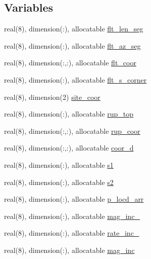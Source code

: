 \subsection*{Variables}
\begin{DoxyCompactItemize}
\item 
real(8), dimension(\+:), allocatable \hyperlink{namespaceflt__module_aca5726712ea516198b181e7cb2f58a79}{flt\+\_\+len\+\_\+seg}
\item 
real(8), dimension(\+:), allocatable \hyperlink{namespaceflt__module_afe7ee1528f7162ad84a3517be2962885}{flt\+\_\+az\+\_\+seg}
\item 
real(8), dimension(\+:,\+:), allocatable \hyperlink{namespaceflt__module_a5f040c388185e1ef250084d5c59d41e9}{flt\+\_\+coor}
\item 
real(8), dimension(\+:), allocatable \hyperlink{namespaceflt__module_ade0f97d7261ffc38567aa16de68c1583}{flt\+\_\+s\+\_\+corner}
\item 
real(8), dimension(2) \hyperlink{namespaceflt__module_a2aeddbabcca2c320d94712a5ef502b79}{site\+\_\+coor}
\item 
real(8), dimension(\+:), allocatable \hyperlink{namespaceflt__module_ab5c2fb389cfd0080d938d50ef55e28ef}{rup\+\_\+top}
\item 
real(8), dimension(\+:,\+:), allocatable \hyperlink{namespaceflt__module_afbf76baeddad45d761cc805c838b369a}{rup\+\_\+coor}
\item 
real(8), dimension(\+:,\+:), allocatable \hyperlink{namespaceflt__module_a46387202eab4affb664fabc1dfbc3523}{coor\+\_\+d}
\item 
real(8), dimension(\+:), allocatable \hyperlink{namespaceflt__module_a388db17b48dfcaeb0b4c53d1a23f83b6}{s1}
\item 
real(8), dimension(\+:), allocatable \hyperlink{namespaceflt__module_a774958e9c5ad266c9faed76a724e27ac}{s2}
\item 
real(8), dimension(\+:), allocatable \hyperlink{namespaceflt__module_a3ae9412ace7bafcdc16443a1de523c08}{p\+\_\+locd\+\_\+arr}
\item 
real(8), dimension(\+:), allocatable \hyperlink{namespaceflt__module_a758f2d6ebaadfe7af02eddd7ab5e4bdd}{mag\+\_\+inc\+\_}
\item 
real(8), dimension(\+:), allocatable \hyperlink{namespaceflt__module_a3aa16b477093fff931adc3d47efb4391}{rate\+\_\+inc\+\_}
\item 
real(8), dimension(\+:), allocatable \hyperlink{namespaceflt__module_af9892b4dca9fdd6644278654eb95f0d2}{mag\+\_\+inc}
\item 

\end{DoxyCompactItemize}
